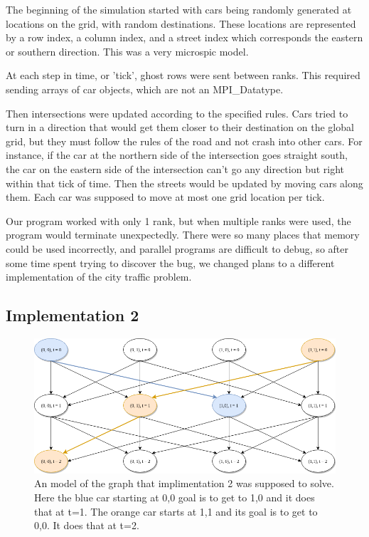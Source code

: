 \documentclass[10pt,a4paper]{article}
\begin{document}
The beginning of the simulation started with cars being randomly generated at locations on the grid, with random destinations. These locations are represented by a row index, a column index, and a street index which corresponds the eastern or southern direction. This was a very microspic model. 

At each step in time, or 'tick', ghost rows were sent between ranks. This required sending arrays of car objects, which are not an MPI\_Datatype.

Then intersections were updated according to the specified rules. Cars tried to turn in a direction that would get them closer to their destination on the global grid, but they must follow the rules of the road and not crash into other cars. For instance, if the car at the northern side of the intersection goes straight south, the car on the eastern side of the intersection can't go any direction but right within that tick of time. Then the streets would be updated by moving cars along them. Each car was supposed to move at most one grid location per tick.

Our program worked with only 1 rank, but when multiple ranks were used, the program would terminate unexpectedly. There were so many places that memory could be used incorrectly, and parallel programs are difficult to debug, so after some time spent trying to discover the bug, we changed plans to a different implementation of the city traffic problem.

\subsection{Implementation 2}

\begin{figure}
    \centering
    \includegraphics[scale=0.5]{imp2_diag.png}
    \caption{An model of the graph that implimentation 2 was supposed to solve. Here the blue car starting at 0,0 goal is to get to 1,0 and it does that at t=1. The orange car starts at 1,1 and its goal is to get to 0,0. It does that at t=2.}
    \label{fig:my_label}
\end{figure}
\end{document}
